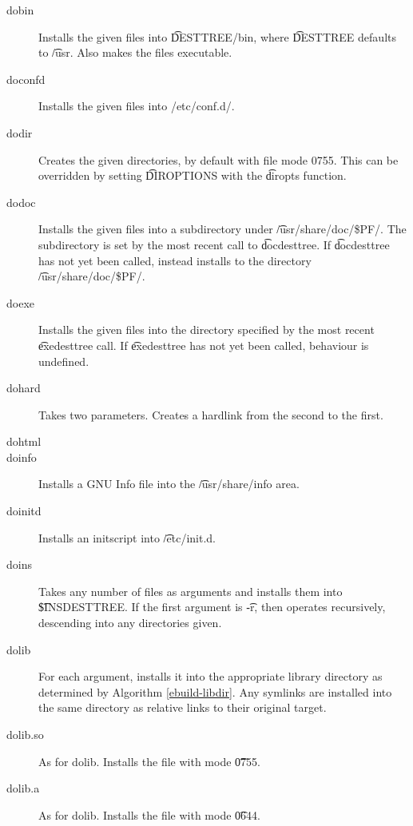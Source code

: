 \begin{description}
\item[dobin] Installs the given files into \t{DESTTREE/bin}, where \t{DESTTREE} defaults to
    \t{/usr}. Also makes the files executable.

\item[doconfd] Installs the given files into /etc/conf.d/.

\item[dodir] Creates the given directories, by default with file mode 0755. This can be overridden
    by setting \t{DIROPTIONS} with the \t{diropts} function.

\item[dodoc] Installs the given files into a subdirectory under \t{/usr/share/doc/\$PF/}. The
    subdirectory is set by the most recent call to \t{docdesttree}. If \t{docdesttree} has not
    yet been called, instead installs to the directory \t{/usr/share/doc/\$PF/}.

\item[doexe] Installs the given files into the directory specified by the most recent
    \t{exedesttree} call. If \t{exedesttree} has not yet been called, behaviour is undefined.

\item[dohard] Takes two parameters. Creates a hardlink from the second to the first.

\item[dohtml] 

\item[doinfo] Installs a GNU Info file into the \t{/usr/share/info} area.

\item[doinitd] Installs an initscript into \t{/etc/init.d}.

\item[doins] Takes any number of files as arguments and installs them into \t{\$INSDESTTREE}. If
    the first argument is \t{-r}, then operates recursively, descending into any directories given.

\item[dolib] For each argument, installs it into the appropriate library directory as determined by
    Algorithm \ref{ebuild-libdir}. Any symlinks are installed into the same directory as relative
    links to their original target.

\item[dolib.so] As for dolib. Installs the file with mode \t{0755}.

\item[dolib.a] As for dolib. Installs the file with mode \t{0644}.


\end{description}
